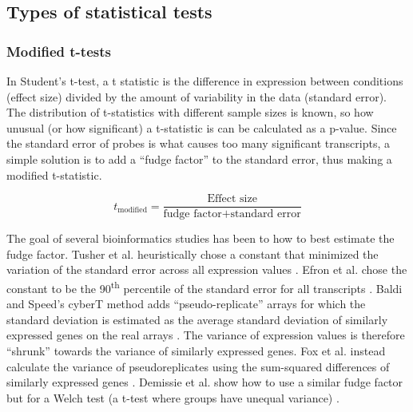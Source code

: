 \subsection{Types of statistical tests}

\subsubsection{Modified t-tests}\label{introjtm:modttests}

In Student's t-test, a t statistic is
the difference in expression between conditions (effect size) divided by the amount 
of variability in the data (standard error). The distribution of t-statistics
with different sample sizes is known, so how unusual (or how significant) a t-statistic is
can be calculated as a p-value.
Since the standard error of probes
is what causes too many significant transcripts, a simple solution
is to add a ``fudge factor'' to the standard error, thus making a
modified t-statistic.

\begin{equation}
t_{\text{modified}} = \frac{\text{Effect size}}{\text{fudge factor} + \text{standard error}}
\end{equation}

The goal of several bioinformatics studies has been to how to
best estimate the fudge factor. Tusher et al. heuristically 
chose a constant that minimized
the variation of the standard error across all
expression values \cite{Tusher:2001kk}.
Efron et al. chose the constant to be the 
90\textsuperscript{th} percentile of the standard
error for all transcripts \cite{Efron:2000wq,Efron:2001uu}.
Baldi and Speed's cyberT method
adds ``pseudo-replicate'' arrays for which the standard deviation
is estimated as the average standard deviation of similarly 
expressed genes on the real arrays \cite{Baldi:2001ul}.
The variance of expression values is therefore ``shrunk'' towards
the variance of similarly expressed genes.
Fox et al. instead calculate
the variance of pseudoreplicates using the sum-squared differences of similarly
expressed genes \cite{Fox:2006hq}.
Demissie et al. show how to use a similar fudge factor but for a 
Welch test (a t-test where groups have unequal variance) \cite{Demissie:2008dv}.

